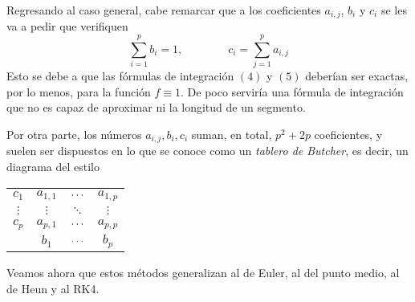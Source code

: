 \documentclass[11pt]{report}
\theoremstyle{mytheorem}
\theoremstyle{mydefinition}
\theoremstyle{myexample}
\begin{document}
\vspace{\parskip}

Regresando al caso general, cabe remarcar que a los coeficientes $a_{i,j}$, $b_i$ y $c_i$ se les va a pedir que verifiquen
\[\sum_{i=1}^p b_i = 1,\qquad \qquad c_i = \sum_{j=1}^p a_{i,j}\]
Esto se debe a que las fórmulas de integración $(4)$ y $(5)$ deberían ser exactas, por lo menos, para la función $f \equiv 1$. De poco serviría una fórmula de integración que no es capaz de aproximar ni la longitud de un segmento.

Por otra parte, los números $a_{i,j},b_i,c_i$ suman, en total, $p^2+2p$ coeficientes, y suelen ser dispuestos en lo que se conoce como un \emph{tablero de Butcher}, es decir, un diagrama del estilo

\begin{center}
\setlength\extrarowheight{2.5pt}
\begin{tabular}{c|ccc}
    $c_1$ & $a_{1,1}$ & $\mathellipsis$ & $a_{1,p}$ \\
    $\vdots$ & $\vdots$ & $\ddots$ & $\vdots$ \\
    $c_p$ & $a_{p,1}$ & $\mathellipsis$ & $a_{p,p}$ \\[5pt] \hline
    & $b_1$ & $\mathellipsis$ & $b_p$
\end{tabular}
\end{center}

Veamos ahora que estos métodos generalizan al de Euler, al del punto medio, al de Heun y al RK4.
\end{document}
